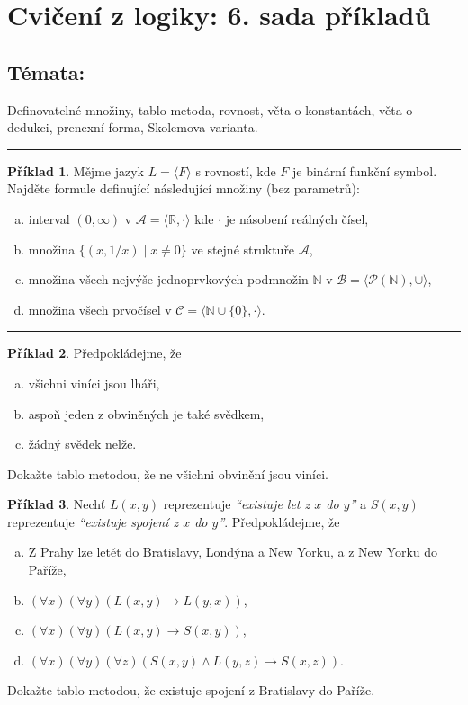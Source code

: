 \documentclass{amsart}
\theoremstyle{definition}
\newtheorem{problem}{Příklad}
\theoremstyle{remark}
\begin{document}
\section*{Cvičení z logiky: 6. sada příkladů}

\medskip

\subsection*{Témata:}  Definovatelné množiny, tablo metoda, rovnost, věta o konstantách, věta o dedukci, prenexní forma, Skolemova varianta.

\medskip
\hrule

\begin{problem}
Mějme jazyk $L=\langle F \rangle$ s rovností, kde $F$ je binární funkční symbol. Najděte formule definující následující množiny (bez parametrů):
\begin{enumerate}[(a)]
\itemsep6pt
    \item interval $(0,\infty)$ v $\mathcal A=\langle\mathbb R, \cdot\rangle$ kde $\cdot$ je násobení reálných čísel,
    \item množina $\{(x, 1/x)\mid x\neq 0\}$ ve stejné struktuře $\mathcal A$,
    \item množina všech nejvýše jednoprvkových podmnožin $\mathbb N$ v $\mathcal B=\langle\mathcal P(\mathbb N),\cup\rangle$,
    \item množina všech prvočísel v $\mathcal C=\langle \mathbb N\cup\{0\}, \cdot\rangle$.
\end{enumerate}
\end{problem}

\medskip
\hrule

\begin{problem}
Předpokládejme, že
\begin{enumerate}[(a)]
\itemsep6pt
\item všichni viníci jsou lháři,
\item aspoň jeden z obviněných je také svědkem,
\item žádný svědek nelže.
\end{enumerate}
Dokažte tablo metodou, že ne všichni obvinění jsou viníci.
\end{problem} 



\begin{problem} Nechť $L(x,y)$ reprezentuje \emph{``existuje let z $x$ do $y$''} a $S(x,y)$ reprezentuje \emph{``existuje spojení z $x$ do $y$''}. Předpokládejme, že
\begin{enumerate}[(a)]
\itemsep6pt
\item Z Prahy lze letět do Bratislavy, Londýna a New Yorku, a z New Yorku do Paříže,
\item $(\forall x)(\forall y)(L(x,y) \to L(y,x))$,
\item $(\forall x)(\forall y)(L(x,y)\to S(x,y))$,
\item $(\forall x)(\forall y)(\forall z)(S(x,y)\wedge L(y,z)\to S(x,z))$.
\end{enumerate}
Dokažte tablo metodou, že existuje spojení z Bratislavy do Paříže.
\end{problem} 
\end{document}
